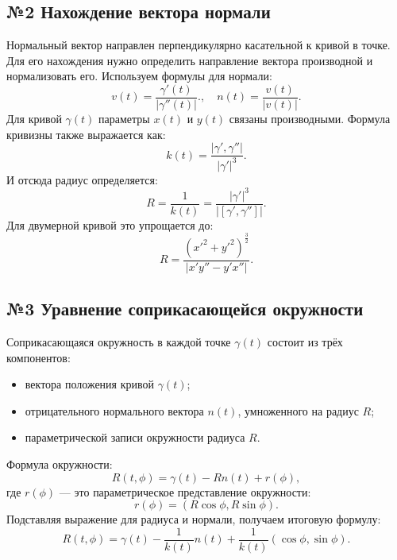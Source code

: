\documentclass{article}
\begin{document}
        \subsection*{№2 Нахождение вектора нормали}
        Нормальный вектор направлен перпендикулярно касательной к кривой в точке. Для его нахождения нужно определить направление вектора производной и нормализовать его. Используем формулы для нормали:
        \[
        v(t) = 
        \frac{\gamma'(t)}{|\gamma''(t)|}.
    , \quad 
        n(t) = \frac{v(t)}{|v(t)|}.
        \]
        Для кривой $\gamma(t)$ параметры $x(t)$ и $y(t)$ связаны производными. Формула кривизны также выражается как:
        \[
        k(t) = \frac{|\gamma', \gamma''|}{|\gamma'|^3}.
        \]
        И отсюда радиус определяется:
        \[
        R = \frac{1}{k(t)} = \frac{|\gamma'|^3}{|[\gamma', \gamma'']|}.
        \]
        Для двумерной кривой это упрощается до:
        \[
        R = \frac{(x'^2 + y'^2)^{\frac{3}{2}}}{|x'y'' - y'x''|}.
        \]
        
        \subsection*{№3 Уравнение соприкасающейся окружности}
        Соприкасающаяся окружность в каждой точке $\gamma(t)$ состоит из трёх компонентов:
        \begin{itemize}
            \item вектора положения кривой $\gamma(t)$;
            \item отрицательного нормального вектора $n(t)$, умноженного на радиус $R$;
            \item параметрической записи окружности радиуса $R$.
        \end{itemize}
        Формула окружности:
        \[
        R(t, \phi) = \gamma(t) - Rn(t) + r(\phi),
        \]
        где $r(\phi)$ — это параметрическое представление окружности:
        \[
        r(\phi) = (R \cos \phi, R \sin \phi).
        \]
        Подставляя выражение для радиуса и нормали, получаем итоговую формулу:
        \[
        R(t, \phi) = \gamma(t) - \frac{1}{k(t)} n(t) + \frac{1}{k(t)} (\cos \phi, \sin \phi).
        \]

       
        
    
\end{document}
